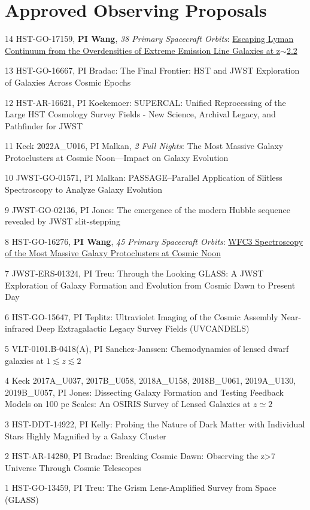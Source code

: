 \documentclass[letterpaper,10pt]{article}
\begin{document}
\vspace*{-.7em}
\section{Approved Observing Proposals}

\begin{list}{}{\leftmargin=1.7em}
    \vspace*{1ex}
    \item[14] HST-GO-17159, \textbf{PI Wang}, \emph{38 Primary Spacecraft Orbits}: \href{https://archive.stsci.edu/proposal_search.php?id=17159&mission=hst}{Escaping Lyman Continuum from the Overdensities of Extreme Emission Line Galaxies at z$\sim$2.2}
    \item[13] HST-GO-16667, PI Bradac: The Final Frontier: HST and JWST Exploration of Galaxies Across Cosmic Epochs
    \item[12] HST-AR-16621, PI Koekemoer: SUPERCAL: Unified Reprocessing of the Large HST Cosmology Survey Fields - New Science, Archival Legacy, and Pathfinder for JWST
    \item[11] Keck 2022A\_U016, PI Malkan, \emph{2 Full Nights}: The Most Massive Galaxy Protoclusters at Cosmic Noon---Impact on Galaxy Evolution
    \item[10] JWST-GO-01571, PI Malkan: PASSAGE--Parallel Application of Slitless Spectroscopy to Analyze Galaxy Evolution
    \item[9] JWST-GO-02136, PI Jones: The emergence of the modern Hubble sequence revealed by JWST slit-stepping
    \item[8] HST-GO-16276, \textbf{PI Wang}, \emph{45 Primary Spacecraft Orbits}: \href{https://archive.stsci.edu/proposal_search.php?id=16276&mission=hst}{WFC3 Spectroscopy of the Most Massive Galaxy Protoclusters at Cosmic Noon}
    \item[7] JWST-ERS-01324, PI Treu: Through the Looking GLASS: A JWST Exploration of Galaxy Formation and Evolution from Cosmic Dawn to Present Day
    \item[6] HST-GO-15647, PI Teplitz: Ultraviolet Imaging of the Cosmic Assembly Near-infrared Deep Extragalactic Legacy Survey Fields (UVCANDELS)
    \item[5] VLT-0101.B-0418(A), PI Sanchez-Janssen: Chemodynamics of lensed dwarf galaxies at $1\lesssim z\lesssim 2$
    \item[4] Keck 2017A\_U037, 2017B\_U058, 2018A\_U158, 2018B\_U061, 2019A\_U130, 2019B\_U057, PI Jones: Dissecting Galaxy Formation and Testing Feedback Models on 100 pc Scales: An OSIRIS Survey of Lensed Galaxies at $z\simeq2$
    \item[3] HST-DDT-14922, PI Kelly: Probing the Nature of Dark Matter with Individual Stars Highly Magnified by a Galaxy Cluster
    \item[2] HST-AR-14280, PI Bradac: Breaking Cosmic Dawn: Observing the z>7 Universe Through Cosmic Telescopes
    \item[1] HST-GO-13459, PI Treu: The Grism Lens-Amplified Survey from Space (GLASS)
\end{list}
\end{document}
